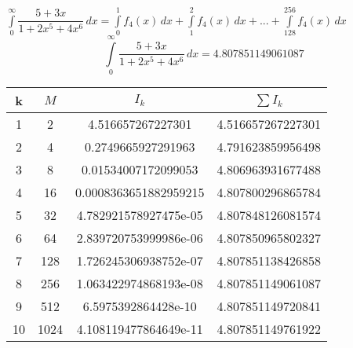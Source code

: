 \documentclass[12pt,a4paper]{article}
\begin{document}
$\displaystyle\int\limits_0^\infty \dfrac{5+3x}{1+2x^5+4x^6}\,dx=\int \limits_0^1 f_4(x)\,dx+\int \limits_1^2 f_4(x)\,dx+...+\int \limits_{128}^{256} f_4(x)\,dx$
$$\displaystyle\int\limits_0^{\infty} \dfrac{5+3x}{1+2x^5+4x^6}\,dx= 4.807851149061087$$
\begin{table}[!h]
	\centering
	\begin{tabular}{|c|c|c|c|}
		\hline
		k  & $M$  & $I_k$                 & $\displaystyle\sum I_k$ \\ \hline
		1  & 2    & 4.516657267227301     & 4.516657267227301       \\ \hline
		2  & 4    & 0.2749665927291963    & 4.791623859956498       \\ \hline
		3  & 8    & 0.01534007172099053   & 4.806963931677488       \\ \hline
		4  & 16   & 0.0008363651882959215 & 4.807800296865784       \\ \hline
		5  & 32   & 4.782921578927475e-05 & 4.807848126081574       \\ \hline
		6  & 64   & 2.839720753999986e-06 & 4.807850965802327       \\ \hline
		7  & 128  & 1.726245306938752e-07 & 4.807851138426858       \\ \hline
		8  & 256  & 1.063422974868193e-08 & 4.807851149061087       \\ \hline
		9  & 512  & 6.5975392864428e-10   & 4.807851149720841       \\ \hline
		10 & 1024 & 4.108119477864649e-11 & 4.807851149761922       \\ \hline
	\end{tabular}
\end{table}
\end{document}
